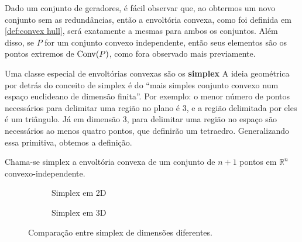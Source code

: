 Dado um conjunto de geradores, é fácil observar que, ao obtermos um
novo conjunto sem as redundâncias, então a envoltória convexa, como
foi definida em \ref{def:convex hull}, será exatamente a mesmas para
ambos os conjuntos. Além disso, se $P$ for um conjunto convexo
independente, então seus elementos são os pontos extremos de \(\mathrm{Conv}(P)\),
como fora observado mais previamente.

Uma classe especial de envoltórias convexas são os \textbf{simplex}
A ideia geométrica por detrás do conceito de simplex é do ``mais simples
conjunto convexo num espaço euclideano de dimensão finita''. Por exemplo:
o menor número de pontos necessários para delimitar uma região no plano é
3, e a região delimitada por eles é um triângulo. Já em dimensão 3, para
delimitar uma região no espaço são necessários ao menos quatro pontos,
que definirão um tetraedro. Generalizando essa primitiva, obtemos a definição.

\begin{def:simplex}
	Chama-se simplex a envoltória convexa de um conjunto de $n+1$ pontos
	em $\mathbb{R}^n$ convexo-independente.
\end{def:simplex}

\begin{figure}[h]
	\centering
	\begin{subfigure}{0.45\textwidth}
		\centering
		\caption{Simplex em 2D}
		\label{fig:triangulo}
	\end{subfigure}
	\hfill
	\begin{subfigure}{0.45\textwidth}
		\centering
		\caption{Simplex em 3D}
		\label{fig:tetraedro}
	\end{subfigure}
	\caption{Comparação entre simplex de dimensões diferentes.}
\end{figure}

